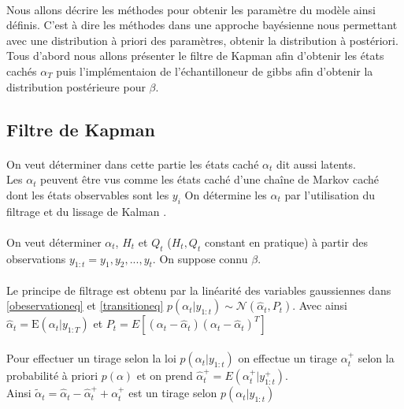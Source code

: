 \documentclass{article}
\theoremstyle{definition}
\theoremstyle{remark}
\begin{document}
\paragraph{}
Nous allons décrire les méthodes pour obtenir les paramètre du modèle ainsi définis. C'est à dire les méthodes dans une approche bayésienne
nous permettant avec une distribution à priori des paramètres, obtenir la distribution à postériori.
Tous d'abord nous allons présenter le filtre de Kapman afin d'obtenir les états cachés $\alpha_T$ puis l'implémentaion de l'échantilloneur de gibbs afin
d'obtenir la distribution postérieure pour $\beta$.

\subsection{Filtre de Kapman}

\paragraph{}
On veut déterminer dans cette partie les états \og{} caché \fg $ \alpha_t$ dit aussi latents. \\
Les $\alpha_t$ peuvent être vus comme les états caché d'une chaîne de Markov caché dont les états observables sont les $y_i$
On détermine les $\alpha_t$ par l'utilisation du filtrage et du lissage de Kalman \cite{kalman}.

\paragraph{}
On veut déterminer $\alpha_t$, $H_t$ et $Q_t$ ($H_t,Q_t$ constant en pratique) à partir des
observations  $y_{1: t} = y_1, y_2, ..., y_t$.
On suppose connu $\beta$.
\paragraph{}
Le principe de filtrage est obtenu par la linéarité des variables gaussiennes dans \ref{obeservationeq} et \ref{transitioneq} 
$p(\alpha_{t} | y_{1: t}) \sim \mathcal{N}(\hat{\alpha}_{t}, P_t)$.
Avec ainsi $\hat{\alpha}_{t} = \mathrm{E}(\alpha_{t} | y_{1:T})$ et 
$P_{t} = E\left[\left(\alpha_{t}-\hat{\alpha}_{t}\right)\left(\alpha_{t}-\hat{\alpha}_{t}\right)^{T}\right]$
\paragraph{}
Pour effectuer un tirage selon la loi $p(\alpha_{t} | y_{1:t})$ on effectue un tirage $\alpha_t^+$ selon la probabilité 
à priori $p(\alpha)$ 
et on prend $\hat{\alpha}_t^+ = E(\alpha_{t}^+ | y_{1:t}^+)$. \\
Ainsi $\tilde{\alpha}_t = \hat{\alpha}_t - \hat{\alpha}_t^+ + \alpha_t^+$ est un tirage selon $p(\alpha_{t} | y_{1: t})$
\end{document}
